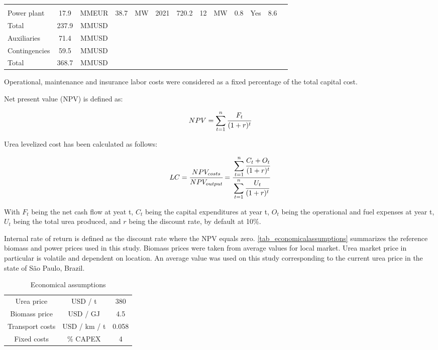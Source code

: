 \documentclass[a4paper, titlepage]{article}
\begin{document}
\begin{table}
\begin{tabular}{|| C{2.3cm} | c | c | c | c | C{1.4cm} | C{1.2cm} | c | c | C{0.9cm} | C{1.4cm} | C{1.5cm} | C{0.9cm} ||}
		\cite{swansonTechnoeconomicAnalysisBiomasstoliquids2010} \\
		Power plant & 17.9 & MMEUR & 38.7 & MW & 2021 & 720.2 & 12 & MW & 0.8 & Yes & 8.6 &
		\cite{cloeteCosteffectiveCleanAmmonia2021} \\
		\hline
		Total & 237.9 & MMUSD & & & & & & & & & & \\
		Auxiliaries & 71.4 & MMUSD & & & & & & & & & & \\
		Contingencies & 59.5 & MMUSD & & & & & & & & & & \\
		\hline
		Total & 368.7 & MMUSD & & & & & & & & & & \\
		\hline
	\end{tabular}

\end{table}

Operational, maintenance and insurance labor costs were considered as a fixed percentage of the total capital cost.

Net present value (NPV) is defined as:

\begin{equation}
	NPV = \sum_{t=1}^n \cfrac{F_t}{(1+r)^t}
\end{equation}

Urea levelized cost has been calculated as follows:

\begin{equation}
	LC = \cfrac{NPV_{costs}}{NPV_{output}} = \cfrac{\displaystyle\sum_{t=1}^n \cfrac{C_t + O_t}{(1+r)^t}}{\displaystyle\sum_{t=1}^n \cfrac{U_t}{(1+r)^t}}
\end{equation}

With $F_t$ being the net cash flow at yeat t, $C_t$ being the capital expenditures at year t, $O_t$ being the
operational and fuel expenses at year t, $U_t$ being the total urea produced, and $r$ being the discount rate,
by default at 10\%.

Internal rate of return is defined as the discount rate where the NPV equals zero.
\autoref{tab_economicalassumptions} summarizes the reference biomass and power prices used in this study. 
Biomass prices were taken from average values for local market. Urea market price in particular is volatile and 
dependent on location. An average value was used on this study corresponding to the current urea price in the state of
São Paulo, Brazil.

\begin{table}
	\centering
	\caption{Economical assumptions}
	\label{tab_economicalassumptions}
	\begin{tabular}{|c | c | c |}
		\hline
		Urea price & USD / t & 380 \\
		Biomass price & USD / GJ & 4.5 \\
		Transport costs & USD / km / t & 0.058 \\
		Fixed costs & \% CAPEX & 4
	\hline	
	\end{tabular}
\end{table}
\end{document}
